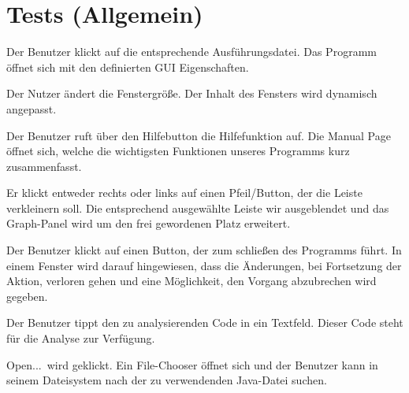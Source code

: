 \section{Tests (Allgemein)}

\tests{}

{Der Benutzer klickt auf die entsprechende Ausführungsdatei.}
{Das Programm öffnet sich mit den definierten GUI Eigenschaften.}

{Der Nutzer ändert die Fenstergröße.}
{Der Inhalt des Fensters wird dynamisch angepasst.}

{Der Benutzer ruft über den Hilfebutton die Hilfefunktion auf.}
{Die Manual Page öffnet sich, welche die wichtigsten Funktionen unseres Programms kurz zusammenfasst.}

{Er klickt entweder rechts oder links auf einen Pfeil/Button, der die Leiste verkleinern soll.}
{Die entsprechend ausgewählte Leiste wir ausgeblendet und das Graph-Panel wird um den frei gewordenen Platz erweitert.}

{Der Benutzer klickt auf einen Button, der zum schließen des Programms führt.}
{In einem Fenster wird darauf hingewiesen, dass die Änderungen, bei Fortsetzung der Aktion, verloren gehen und eine Möglichkeit, den Vorgang abzubrechen wird gegeben.}

\tests{}

{Der Benutzer tippt den zu analysierenden Code in ein Textfeld.}
{Dieser Code steht für die Analyse zur Verfügung.}

{\glqq Open...\grqq\ wird geklickt.}
{Ein File-Chooser öffnet sich und der Benutzer kann in seinem Dateisystem nach der zu verwendenden Java-Datei suchen.}

